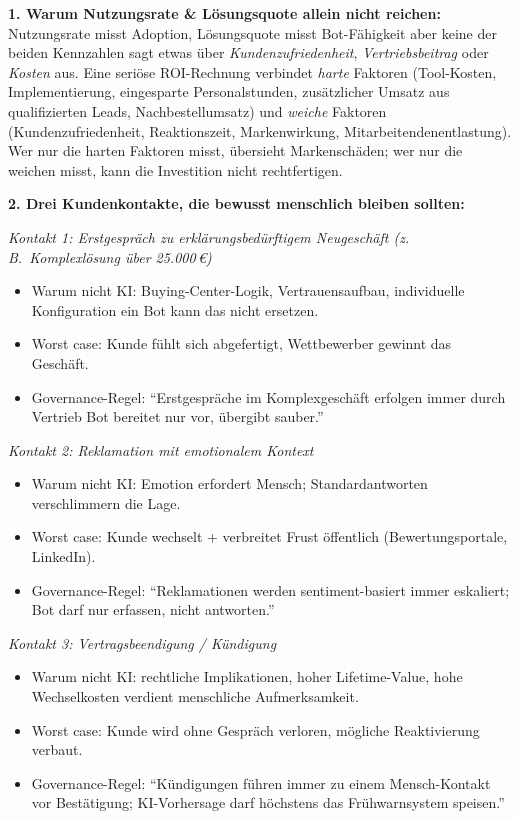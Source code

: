 \documentclass[11pt,a4paper,oneside]{article}
\begin{document}
\begin{loesungbox}
\textbf{1. Warum Nutzungsrate \& Lösungsquote allein nicht reichen:}
Nutzungsrate misst Adoption, Lösungsquote misst Bot-Fähigkeit \textendash{} aber keine der beiden Kennzahlen sagt etwas über \emph{Kundenzufriedenheit}, \emph{Vertriebsbeitrag} oder \emph{Kosten} aus. Eine seriöse ROI-Rechnung verbindet \emph{harte} Faktoren (Tool-Kosten, Implementierung, eingesparte Personalstunden, zusätzlicher Umsatz aus qualifizierten Leads, Nachbestellumsatz) und \emph{weiche} Faktoren (Kundenzufriedenheit, Reaktionszeit, Markenwirkung, Mitarbeitendenentlastung). Wer nur die harten Faktoren misst, übersieht Markenschäden; wer nur die weichen misst, kann die Investition nicht rechtfertigen.

\smallskip
\textbf{2. Drei Kundenkontakte, die bewusst menschlich bleiben sollten:}

\smallskip
\emph{Kontakt 1: Erstgespräch zu erklärungsbedürftigem Neugeschäft (z.\,B.\ Komplexlösung über 25.000\,\euro)}
\begin{itemize}
  \item Warum nicht KI: Buying-Center-Logik, Vertrauensaufbau, individuelle Konfiguration \textendash{} ein Bot kann das nicht ersetzen.
  \item Worst case: Kunde fühlt sich abgefertigt, Wettbewerber gewinnt das Geschäft.
  \item Governance-Regel: ``Erstgespräche im Komplexgeschäft erfolgen immer durch Vertrieb \textendash{} Bot bereitet nur vor, übergibt sauber.''
\end{itemize}

\emph{Kontakt 2: Reklamation mit emotionalem Kontext}
\begin{itemize}
  \item Warum nicht KI: Emotion erfordert Mensch; Standardantworten verschlimmern die Lage.
  \item Worst case: Kunde wechselt + verbreitet Frust öffentlich (Bewertungsportale, LinkedIn).
  \item Governance-Regel: ``Reklamationen werden sentiment-basiert immer eskaliert; Bot darf nur erfassen, nicht antworten.''
\end{itemize}

\emph{Kontakt 3: Vertragsbeendigung / Kündigung}
\begin{itemize}
  \item Warum nicht KI: rechtliche Implikationen, hoher Lifetime-Value, hohe Wechselkosten \textendash{} verdient menschliche Aufmerksamkeit.
  \item Worst case: Kunde wird ohne Gespräch verloren, mögliche Reaktivierung verbaut.
  \item Governance-Regel: ``Kündigungen führen immer zu einem Mensch-Kontakt vor Bestätigung; KI-Vorhersage darf höchstens das Frühwarnsystem speisen.''
\end{itemize}


\end{loesungbox}
\end{document}
